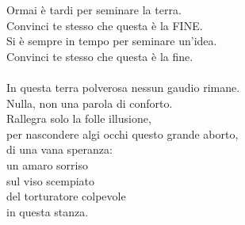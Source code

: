 \documentclass[10pt,twoside,twocolumn]{article}
\begin{document}
{  Ormai è tardi per seminare la terra.\\
  Convinci te stesso che questa è la FINE.\\
  Si è sempre in tempo per seminare un'idea.\\
  Convinci te stesso che questa è la fine.\\
  \\
  In questa terra polverosa nessun gaudio rimane.\\
  Nulla, non una parola di conforto.\\
  Rallegra solo la folle illusione,\\
  per nascondere algi occhi questo grande aborto,\\
  di una vana speranza:\\
  un amaro sorriso\\
  sul viso scempiato\\
  del torturatore colpevole\\
  in questa stanza.\\
}
\end{document}

